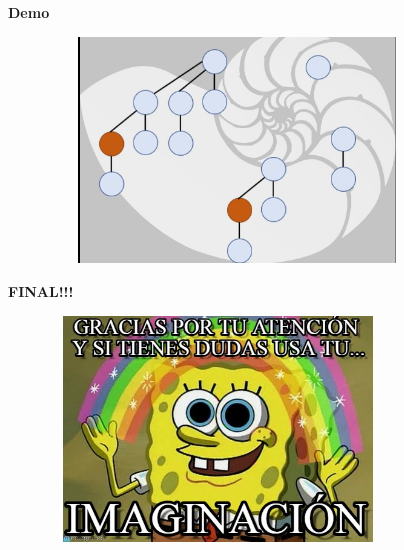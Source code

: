 \documentclass[11pt]{beamer}
\begin{document}
\begin{frame}{\bf \large {}}

{\center \bf \Large \color{red} Demo \\}
\begin{figure}[center]

  \includegraphics[width=10cm, height=6cm]{Img/Demo.jpg}
  
\end{figure}
\end{frame}

\begin{frame}{\bf \large {}}

{\center \bf \Huge \color{purple} FINAL!!! \\}
\begin{figure}[center]

  \includegraphics[width=9cm, height=6cm]{Img/Gracias.jpg}
  
\end{figure}
\end{frame}
\end{document}

